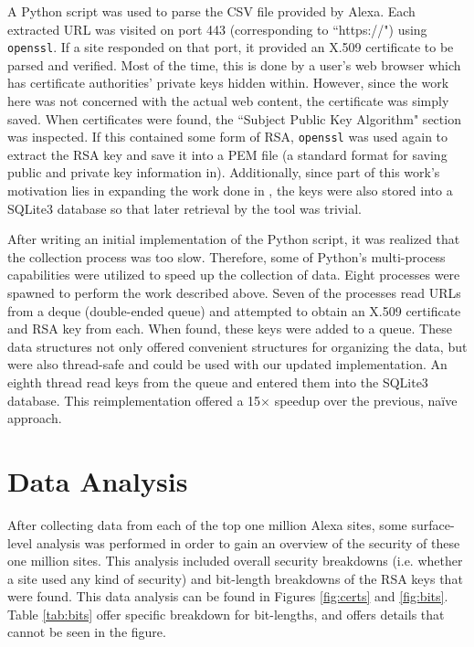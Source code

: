 \documentclass{acm_proc_article-sp}
\begin{document}
A Python script was used to parse the CSV file provided by Alexa. Each
extracted URL was visited on port 443 (corresponding to ``https://") using 
\texttt{openssl}. If a site responded on that port, it provided an X.509
certificate to be parsed and verified. Most of the time, this is done by a
user's web browser which has certificate authorities' private keys hidden
within. However, since the work here was not concerned with the actual web
content, the certificate was simply saved. When certificates were found, the
``Subject Public Key Algorithm" section was inspected. If this contained some
form of RSA, \texttt{openssl} was used again to extract the RSA key and save
it into a PEM file (a standard format for saving public and private key
information in). Additionally, since part of this work's motivation lies in
expanding the work done in \cite{scharfglass2012breaking}, the keys were also
stored into a SQLite3 database so that later retrieval by the tool was trivial.

After writing an initial implementation of the Python script, it was realized
that the collection process was too slow. Therefore, some of Python's
multi-process capabilities were utilized to speed up the collection of data.
Eight processes were spawned to perform the work described above. Seven of the
processes read URLs from a deque (double-ended queue) and attempted to obtain
an X.509 certificate and RSA key from each. When found, these keys were added
to a queue. These data structures not only offered convenient structures for
organizing the data, but were also thread-safe and could be used with our
updated implementation. An eighth thread read keys from the queue and entered
them into the SQLite3 database. This reimplementation offered a 15$\times$
speedup over the previous, na\"{i}ve approach.

\section{Data Analysis}
After collecting data from each of the top one million Alexa sites, some
surface-level analysis was performed in order to gain an overview of the
security of these one million sites. This analysis included overall security
breakdowns (i.e. whether a site used any kind of security) and
bit-length breakdowns of the RSA keys that were found. This data analysis can
be found in Figures \ref{fig:certs} and \ref{fig:bits}. Table \ref{tab:bits}
offer specific breakdown for bit-lengths, and offers details that cannot be
seen in the figure.
\end{document}
